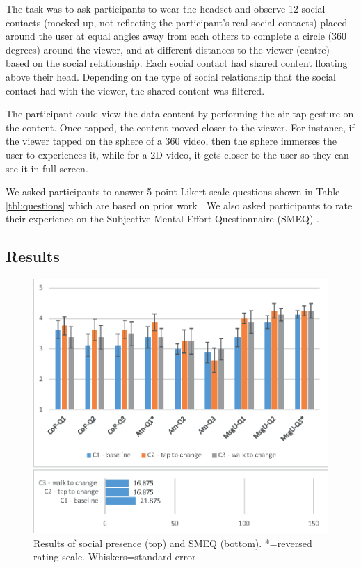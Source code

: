 The task was to ask participants to wear the headset and observe 12 social contacts (mocked up, not reflecting the participant's real social contacts) placed around the user at equal angles away from each others to complete a circle (360 degrees) around the viewer, and at different distances to the viewer (centre)  based on the social relationship. 
Each social contact had shared content floating above their head. Depending on the type of social relationship that the social contact had with the viewer, the shared content was filtered. 

The participant could view the data content by performing the air-tap gesture on the content. Once tapped, the content moved closer to the viewer. For instance, if the viewer tapped on the sphere of a 360 video, then the sphere immerses the user to experiences it, while for a 2D video, it gets closer to the user so they can see it in full screen.

We asked participants to answer 5-point Likert-scale questions shown in Table \ref{tbl:questions} which are based on prior work \cite{Biocca2003}. We also asked participants to rate their experience on the Subjective Mental Effort Questionnaire (SMEQ) \cite{Sauro2009}. 

\subsection{Results}

\begin{figure}[h]
  \centering
  \includegraphics[width=\columnwidth]{images/chi/images-01.eps}
  \caption{Results of social presence (top) and SMEQ (bottom). *=reversed rating scale. Whiskers=standard error}
  \label{fig:data:results}
\end{figure}

